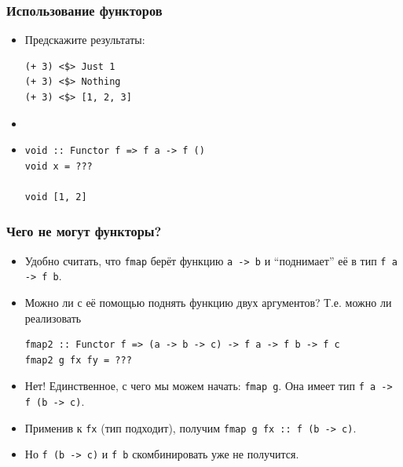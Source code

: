 \documentclass[11pt]{beamer}
\begin{document}
\begin{frame}[fragile]
  \frametitle{Использование функторов}
  \begin{itemize}
    \item Предскажите результаты:
          \begin{lstlisting}
(+ 3) <$> Just 1
(+ 3) <$> Nothing
(+ 3) <$> [1, 2, 3]
\end{lstlisting}
          \pause \item[] \item
          \begin{lstlisting}
void :: Functor f => f a -> f ()
void x = ???

void [1, 2]
\end{lstlisting}

  \end{itemize}
\end{frame}

\begin{frame}[fragile]
  \frametitle{Чего не могут функторы?}
  \begin{itemize}
    \item Удобно считать, что \lstinline|fmap| берёт функцию \lstinline|a -> b| и \enquote{поднимает} её в тип \lstinline|f a -> f b|.
    \item Можно ли с её помощью поднять функцию двух аргументов? Т.е. можно ли реализовать
          \begin{lstlisting}
fmap2 :: Functor f => (a -> b -> c) -> f a -> f b -> f c
fmap2 g fx fy = ???
\end{lstlisting}
          \pause
    \item Нет! Единственное, с чего мы можем начать: \pause \lstinline|fmap g|. Она имеет тип \pause \lstinline|f a -> f (b -> c)|.
    \item Применив к \lstinline|fx| (тип подходит), получим
          \lstinline|fmap g fx :: f (b -> c)|. \pause
    \item Но \lstinline|f (b -> c)| и  \lstinline|f b| скомбинировать уже не получится.
  \end{itemize}
\end{frame}
\end{document}
